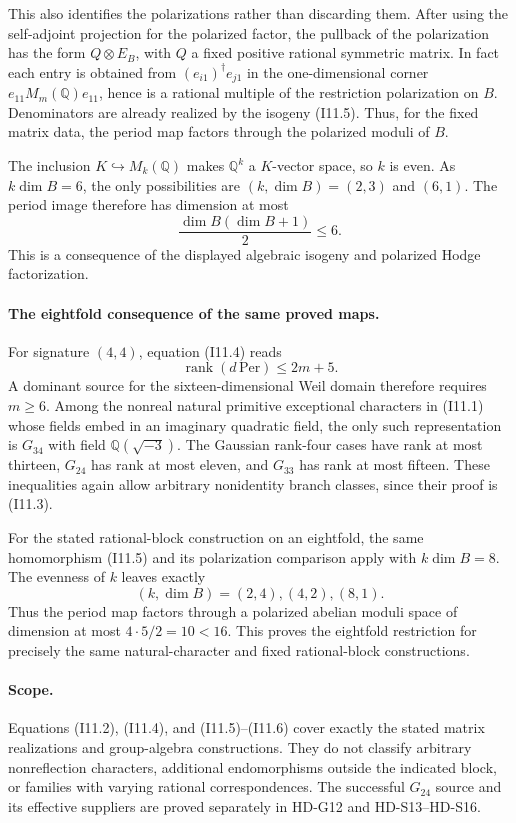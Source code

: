 This also identifies the polarizations rather than discarding
them. After using the self-adjoint projection for the polarized
factor, the pullback of the polarization has the form
$Q\otimes E_B$, with $Q$ a fixed positive rational symmetric
matrix. In fact each entry is obtained from
$(e_{i1})^{\dagger}e_{j1}$ in the one-dimensional corner
$e_{11}M_m(\mathbb Q)e_{11}$, hence is a rational multiple of
the restriction polarization on $B$. Denominators are already
realized by the isogeny (I11.5).
Thus, for the fixed matrix data, the period map factors through
the polarized moduli of $B$.

The inclusion $K\hookrightarrow M_k(\mathbb Q)$ makes
$\mathbb Q^k$ a $K$-vector space, so $k$ is even. As
$k\dim B=6$, the only possibilities are
$(k,\dim B)=(2,3)$ and $(6,1)$. The period image therefore has
dimension at most
\[
 \frac{\dim B(\dim B+1)}2\le6.                            \tag{I11.6}
\]
This is a consequence of the displayed algebraic isogeny and
polarized Hodge factorization.

\paragraph{The eightfold consequence of the same proved maps.}
For signature $(4,4)$, equation (I11.4) reads
\[
 \operatorname{rank}(d\,\mathrm{Per})\le 2m+5.
                                                               \tag{I11.7}
\]
A dominant source for the sixteen-dimensional Weil domain
therefore requires $m\ge6$. Among the nonreal natural primitive
exceptional characters in (I11.1) whose fields embed in an
imaginary quadratic field, the only such representation is
$G_{34}$ with field $\mathbb Q(\sqrt{-3})$.
The Gaussian rank-four cases have rank at most thirteen,
$G_{24}$ has rank at most eleven, and $G_{33}$ has rank at most
fifteen. These inequalities again allow arbitrary nonidentity
branch classes, since their proof is (I11.3).

For the stated rational-block construction on an eightfold,
the same homomorphism (I11.5) and its polarization comparison
apply with $k\dim B=8$. The evenness of $k$ leaves exactly
\[
 (k,\dim B)=(2,4),(4,2),(8,1).
\]
Thus the period map factors through a polarized abelian moduli
space of dimension at most $4\cdot5/2=10<16$.
This proves the eightfold restriction for precisely the same
natural-character and fixed rational-block constructions.

\paragraph{Scope.}
Equations (I11.2), (I11.4), and (I11.5)--(I11.6) cover exactly
the stated matrix realizations and group-algebra constructions.
They do not classify arbitrary nonreflection characters,
additional endomorphisms outside the indicated block, or
families with varying rational correspondences.
The successful $G_{24}$ source and its effective suppliers are
proved separately in HD-G12 and HD-S13--HD-S16.
